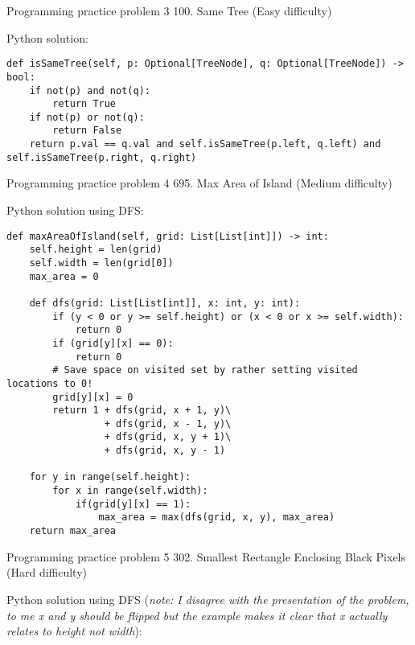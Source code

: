 \documentclass{article}
\begin{document}
\newpage

\begin{problem}{Programming practice problem 3}
    100. Same Tree (Easy difficulty)
\end{problem}

Python solution:

\begin{verbatim}
def isSameTree(self, p: Optional[TreeNode], q: Optional[TreeNode]) -> bool:
    if not(p) and not(q):
        return True
    if not(p) or not(q):
        return False
    return p.val == q.val and self.isSameTree(p.left, q.left) and self.isSameTree(p.right, q.right)
\end{verbatim}

\begin{problem}{Programming practice problem 4}
    695. Max Area of Island (Medium difficulty)
\end{problem}

Python solution using DFS:

\begin{verbatim}
def maxAreaOfIsland(self, grid: List[List[int]]) -> int:
    self.height = len(grid)
    self.width = len(grid[0])
    max_area = 0

    def dfs(grid: List[List[int]], x: int, y: int):
        if (y < 0 or y >= self.height) or (x < 0 or x >= self.width):
            return 0
        if (grid[y][x] == 0):
            return 0
        # Save space on visited set by rather setting visited locations to 0!
        grid[y][x] = 0
        return 1 + dfs(grid, x + 1, y)\
                 + dfs(grid, x - 1, y)\
                 + dfs(grid, x, y + 1)\
                 + dfs(grid, x, y - 1)

    for y in range(self.height):
        for x in range(self.width):
            if(grid[y][x] == 1):
                max_area = max(dfs(grid, x, y), max_area)
    return max_area
\end{verbatim}

\newpage

\begin{problem}{Programming practice problem 5}
    302. Smallest Rectangle Enclosing Black Pixels (Hard difficulty)
\end{problem}

Python solution using DFS (\textit{note: I disagree with the presentation of the problem, to me x and y should be flipped but the example makes it clear that x actually relates to height not width}):
\end{document}
